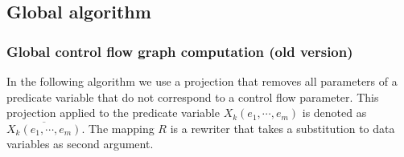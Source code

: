                       

\subsection{Global algorithm}

\subsubsection{Global control flow graph computation (old version)}

In the following algorithm we use a projection that removes all parameters
of a predicate variable that do not correspond to a control flow parameter.
This projection applied to the predicate variable $X_{k}(e_{1},\cdots
,e_{m}) $ is denoted as $\overline{X_{k}(e_{1},\cdots ,e_{m})}$. The mapping 
$R$ is a rewriter that takes a substitution to data variables as second
argument.

